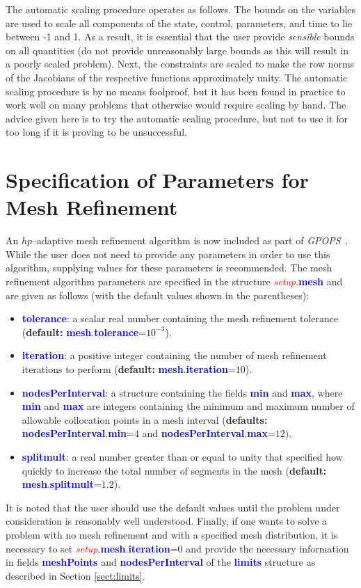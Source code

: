 \documentclass[10pt]{article}
\newcommand{\gpops}{{\em GPOPS}~}
\newcommand{\bfblue}[1]{\textcolor{blue}{\bf #1}}
\newcommand{\slred}[1]{\textcolor{red}{\sl #1}}
\begin{document}
The automatic scaling procedure operates as follows.  The bounds on the
variables are used to scale all components of the state, control, parameters,
and time to lie between -1 and 1.  As a result, it is essential that the user
provide {\em sensible} bounds on all quantities (\eg do not provide
unreasonably large bounds as this will result in a poorly scaled problem).
Next, the constraints are scaled to make the row norms of the Jacobians of the
respective functions approximately unity.  The automatic scaling procedure is
by no means foolproof, but it has been found in practice to work well on many
problems that otherwise would require scaling by hand.  The advice given here
is to try the automatic scaling procedure, but not to use it for too long if
it is proving to be unsuccessful.

\section{Specification of Parameters for Mesh Refinement\label{sect:mesh}}

An $hp$--adaptive mesh refinement algorithm is now included as part of
\gpops.  While the user does not need to provide any parameters in
order to use this algorithm, supplying values for these parameters is
recommended.  The mesh refinement algorithm parameters are specified
in the structure \slred{setup}.\bfblue{mesh} and are given as follows
(with the default values shown in the parentheses): 
\begin{itemize}
\item \bfblue{tolerance}:  a scalar real number containing the mesh
 refinement tolerance ({\bf default: }\bfblue{mesh}.\bfblue{tolerance}=$10^{-3}$).  
\item \bfblue{iteration}:  a positive integer containing the 
 number of mesh refinement iterations to perform ({\bf default: }\bfblue{mesh}.\bfblue{iteration}=$10$).  
\item \bfblue{nodesPerInterval}:  a structure containing the fields
  \bfblue{min} and \bfblue{max}, where \bfblue{min} and \bfblue{max}
  are integers containing the minimum and maximum number of allowable
  collocation points in a mesh interval ({\bf defaults: }
  \bfblue{nodesPerInterval}.\bfblue{min}=$4$ and \bfblue{nodesPerInterval}.\bfblue{max}=$12$).    
\item \bfblue{splitmult}:  a real number greater than or equal to
  unity that specified how quickly to increase the total number of
  segments in the mesh ({\bf default: }\bfblue{mesh}.\bfblue{splitmult}=$1.2$).  
\end{itemize}
It is noted that the user should use the default values until the
problem under consideration is reasonably well understood.   Finally,
if one wants to solve a problem with no mesh refinement and with a
specified mesh distribution, it is necessary to set
\slred{setup}.\bfblue{mesh}.\bfblue{iteration}=0 and provide the
necessary information in fields \bfblue{meshPoints} and
\bfblue{nodesPerInterval} of the \bfblue{limits} structure as
described in Section \ref{sect:limits}.  
\end{document}
